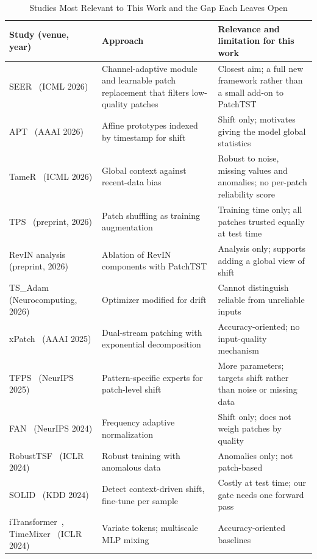 \begin{table}[!t]
\centering
\caption{Studies Most Relevant to This Work and the Gap Each Leaves Open}
\label{tab:lit}
\footnotesize
\renewcommand{\arraystretch}{1.15}
\begin{tabular}{@{}p{}p{}p{}@{}}
\toprule
Study (venue, year) & Approach & Relevance and limitation for this work \\
\midrule
SEER~\cite{seer} (ICML 2026) & Channel-adaptive module and learnable patch replacement that filters low-quality patches & Closest aim; a full new framework rather than a small add-on to PatchTST \\
APT~\cite{apt} (AAAI 2026) & Affine prototypes indexed by timestamp for shift & Shift only; motivates giving the model global statistics \\
TameR~\cite{tamer} (ICML 2026) & Global context against recent-data bias & Robust to noise, missing values and anomalies; no per-patch reliability score \\
TPS~\cite{tps} (preprint, 2026) & Patch shuffling as training augmentation & Training time only; all patches trusted equally at test time \\
RevIN analysis~\cite{revinrole} (preprint, 2026) & Ablation of RevIN components with PatchTST & Analysis only; supports adding a global view of shift \\
TS\_Adam~\cite{tsadam} (Neurocomputing, 2026) & Optimizer modified for drift & Cannot distinguish reliable from unreliable inputs \\
xPatch~\cite{xpatch} (AAAI 2025) & Dual-stream patching with exponential decomposition & Accuracy-oriented; no input-quality mechanism \\
TFPS~\cite{tfps} (NeurIPS 2025) & Pattern-specific experts for patch-level shift & More parameters; targets shift rather than noise or missing data \\
FAN~\cite{fan} (NeurIPS 2024) & Frequency adaptive normalization & Shift only; does not weigh patches by quality \\
RobustTSF~\cite{robusttsf} (ICLR 2024) & Robust training with anomalous data & Anomalies only; not patch-based \\
SOLID~\cite{solid} (KDD 2024) & Detect context-driven shift, fine-tune per sample & Costly at test time; our gate needs one forward pass \\
iTransformer~\cite{itransformer}, TimeMixer~\cite{timemixer} (ICLR 2024) & Variate tokens; multiscale MLP mixing & Accuracy-oriented baselines \\

\end{tabular}
\end{table}
